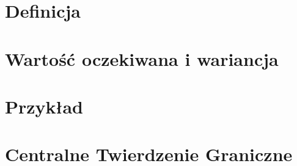 \section{Definicja}


\section{Wartość oczekiwana i wariancja}


\section{Przykład}


\section{Centralne Twierdzenie Graniczne}
